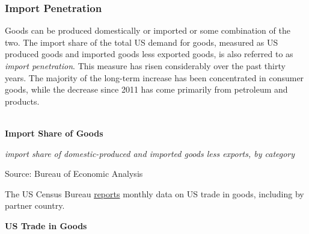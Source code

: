 \documentclass{report}
\makeatletter
\newcommand{\tbllink}[1]{\href{https://raw.githubusercontent.com/bdecon/US-chartbook/master/chartbook/data/#1}{\faTable}}
\newcommand*\short[1]{\expandafter\@gobbletwo\number\numexpr#1\relax}
\newcommand{\sbar}[4]{
		\addplot[ybar stacked, bar width=2.6pt, draw opacity=0, fill=#1] 
			table [x=#2, y=#3, col sep=comma]{#4};}
\newcommand{\dateaxisticks}{
		date coordinates in=x, axis line style={draw=none},
		xmax={2020-08-10},
		max space between ticks=40,	    
		xtick={{1990-01-01}, {1992-01-01}, {1994-01-01}, 
			{1996-01-01}, {1998-01-01}, {2000-01-01}, 
			{2002-01-01}, {2004-01-01}, {2006-01-01},
			{2008-01-01}, {2010-01-01}, {2012-01-01}, {2014-01-01},
		    {2016-01-01}, {2018-01-01}, {2020-01-01}},
		minor xtick={{1989-01-01}, {1991-01-01}, {1993-01-01},
			{1995-01-01}, {1997-01-01}, {1999-01-01}, 
			{2001-01-01}, {2003-01-01}, {2005-01-01}, {2007-01-01},
		    {2009-01-01}, {2011-01-01}, {2013-01-01}, {2015-01-01},
		    {2017-01-01}, {2019-01-01}},
		enlarge y limits={0.06}, enlarge x limits={0.01},
		}
\newcommand{\bbar}[2]{extra #1 ticks = {{#2}}, extra #1 tick labels = ,
		extra #1 tick style = {grid=major, grid style={thick, black!25}},}
\newcommand{\rbars}{
		\fill[color=black!10] (axis cs:{1990-07-01},\pgfkeysvalueof{/pgfplots/ymin}) rectangle 
			(axis cs:{1991-03-01}, \pgfkeysvalueof{/pgfplots/ymax});
		\fill[color=black!10] (axis cs:{2007-12-01},\pgfkeysvalueof{/pgfplots/ymin}) rectangle 
			(axis cs:{2009-07-01}, \pgfkeysvalueof{/pgfplots/ymax});
		\fill[color=black!10] (axis cs:{2001-03-01},\pgfkeysvalueof{/pgfplots/ymin}) rectangle 
			(axis cs:{2001-11-01}, \pgfkeysvalueof{/pgfplots/ymax});
		\fill[color=black!10] (axis cs:{2020-02-01},\pgfkeysvalueof{/pgfplots/ymin}) rectangle 
			(axis cs:{2020-09-01}, \pgfkeysvalueof{/pgfplots/ymax});}
\makeatother
\begin{document}
{{{{{{\newpage
\subsubsection*{\color{black!70} \seriffont Import Penetration}
\begin{minipage}{0.76\textwidth}
\small Goods can be produced domestically or imported or some combination of the two. The import share of the total US demand for goods, measured as US produced goods and imported goods less exported goods, is also referred to as \textit{import penetration}. This measure has risen considerably over the past thirty years. The majority of the long-term increase has been concentrated in consumer goods, while the decrease since 2011 has come primarily from petroleum and products. \\

 \\



\vspace{3mm}

\normalsize \textbf{Import Share of Goods}

\footnotesize{\textit{import share of domestic-produced and imported goods less exports, by category}}

\hspace*{-2mm} 

\footnotesize{Source: Bureau of Economic Analysis} \hfill \tbllink{goodsimpsh.csv}
\end{minipage}
\newpage
\begin{minipage}{0.76\textwidth}
\small The US Census Bureau \href{https://www.census.gov/foreign-trade/data/index.html}{reports} monthly data on US trade in goods, including by partner country.  
\vspace{4mm}

\normalsize \textbf{US Trade in Goods} \hspace{14mm}  \hspace{24mm} 


\end{minipage}}}}}}}
\end{document}
